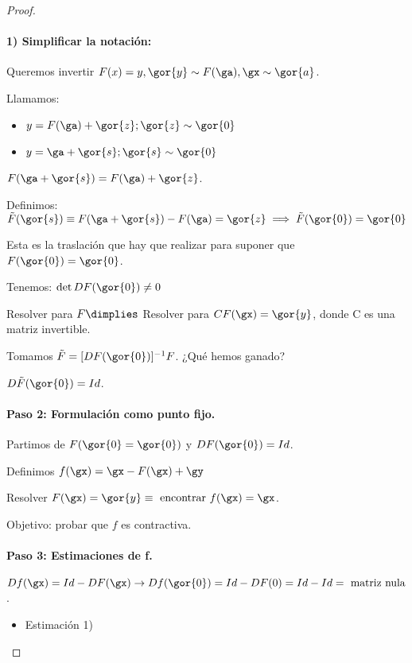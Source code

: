 \documentclass{apuntes}
\begin{document}
\begin{proof}
 \paragraph{1) Simplificar la notación:}
 
 Queremos invertir $F(x) = y, \gor{y} \sim F(\ga), \gx \sim \gor{a}$.
 
 Llamamos:
 \begin{itemize}
  \item $y = F(\ga) + \gor{z}; \gor{z} \sim \gor{0}$
  \item $y = \ga + \gor{s}; \gor{s} \sim \gor{0}$
 \end{itemize}
 $F(\ga+\gor{s}) = F(\ga)+\gor{z}$.
 
 Definimos: $\tilde{F}(\gor{s}) \equiv F(\ga + \gor{s}) - F(\ga) = \gor{z} \implies \tilde{F}(\gor{0}) = \gor{0}$
 
 Esta es la traslación que hay que realizar para suponer que $F(\gor{0}) = \gor{0}$.
 
 Tenemos: $\det DF(\gor{0}) \neq 0$
 
 Resolver para $F \dimplies $ Resolver para $CF(\gx) = \gor{y}$, donde C es una matriz invertible.
 
 Tomamos $\tilde{F} = [DF(\gor{0})]^{-1}F$. ¿Qué hemos ganado?
 
 $D\tilde{F}(\gor{0}) = Id$.
 
 \paragraph{Paso 2: Formulación como punto fijo.}

 Partimos de $F(\gor{0}=\gor{0})$ y $ DF(\gor{0}) = Id$.
 
 Definimos $f(\gx) = \gx - F(\gx)+\gy$
 
 Resolver $F(\gx) = \gor{y} \equiv \text{ encontrar } f(\gx) = \gx$.
 
 Objetivo: probar que $f$ es contractiva.
 
 \paragraph{Paso 3: Estimaciones de f.\\}
 
 $Df(\gx) = Id - DF(\gx) \rightarrow Df(\gor{0}) = Id - DF(0) = Id - Id = \text{ matriz nula}$.
 
 \begin{itemize}
  \item Estimación 1)
  

\end{itemize}
\end{proof}
\end{document}
